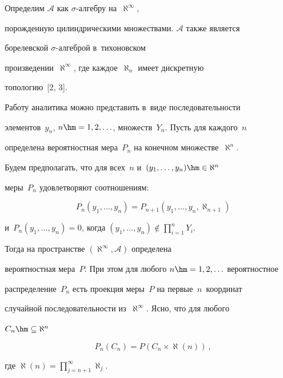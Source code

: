   


  Определим $\mathcal{A}$ как $\sigma$-алгебру на~$\aleph^\infty$, 


порожденную цилиндрическими множествами. $\mathcal{A}$ также является 


борелевской  $\sigma$-ал\-геб\-рой в~тихоновском 


произведении~$\aleph^\infty$, где каждое~$\aleph_n$ имеет дискретную 


топологию~[2, 3].


  


  Работу аналитика можно представить в~виде последовательности 


элементов~$y_n$, $n\hm=1,2,\ldots$, множеств~$Y_n$. Пусть для каждого~$n$ 


определена вероятностная мера~$P_n$ на конечном множестве~$\aleph^n$. 


Будем предполагать, что для всех~$n$ и~$(y_1,\ldots, y_n)\hm\in \aleph^n$ 


меры~$P_n$ удовлетворяют соотношениям:


  $$


  P_n\left( y_1,\ldots ,y_n\right) =P_{n+1}\left( y_1,\ldots , y_n,  


\aleph_{n+1}\right)


  $$


и~$P_n\left(y_1,\ldots, y_n\right)=0$, когда $\left( y_1,\ldots, y_n\right)\notin 


\prod\nolimits^n_{i=1} Y_i$. 





  Тогда на пространстве $(\aleph^\infty, \mathcal{A})$ определена 


вероятностная мера~$P$. При этом для любого $n\hm=1,2,\ldots$ вероятностное 


распределение~$P_n$ есть проекция меры~$P$ на первые~$n$~координат 


случайной последовательности из~$\aleph^\infty$. Ясно, что для любого 


$C_n\hm\subseteq \aleph^n$


  \begin{equation}


  P_n\left(C_n\right) =P\left( C_n\times \aleph(n)\right)\,,


  \label{e1-mar}


  \end{equation}


где  $\aleph(n)=\prod\nolimits_{j=n+1}^\infty \aleph_j$.


